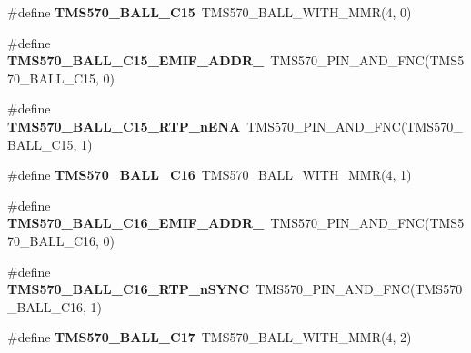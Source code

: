 \begin{DoxyCompactItemize}
\mbox{\label{tms570lc4357-pins_8h_a3f1a39d84701cc2e8a44c9b2fc0c33dd}} 
\#define {\bfseries T\+M\+S570\+\_\+\+B\+A\+L\+L\+\_\+\+C15}~T\+M\+S570\+\_\+\+B\+A\+L\+L\+\_\+\+W\+I\+T\+H\+\_\+\+M\+MR(4, 0)
\item 
\mbox{\label{tms570lc4357-pins_8h_a3ce8f2c75b443108578823520bae6f91}} 
\#define {\bfseries T\+M\+S570\+\_\+\+B\+A\+L\+L\+\_\+\+C15\+\_\+\+E\+M\+I\+F\+\_\+\+A\+D\+D\+R\+\_}~T\+M\+S570\+\_\+\+P\+I\+N\+\_\+\+A\+N\+D\+\_\+\+F\+NC(T\+M\+S570\+\_\+\+B\+A\+L\+L\+\_\+\+C15, 0)
\item 
\mbox{\label{tms570lc4357-pins_8h_ac6518af08529ec983251367b8fb5799b}} 
\#define {\bfseries T\+M\+S570\+\_\+\+B\+A\+L\+L\+\_\+\+C15\+\_\+\+R\+T\+P\+\_\+n\+E\+NA}~T\+M\+S570\+\_\+\+P\+I\+N\+\_\+\+A\+N\+D\+\_\+\+F\+NC(T\+M\+S570\+\_\+\+B\+A\+L\+L\+\_\+\+C15, 1)
\item 
\mbox{\label{tms570lc4357-pins_8h_ac5b737fd92ff1bb7dd30a62441b8b2c8}} 
\#define {\bfseries T\+M\+S570\+\_\+\+B\+A\+L\+L\+\_\+\+C16}~T\+M\+S570\+\_\+\+B\+A\+L\+L\+\_\+\+W\+I\+T\+H\+\_\+\+M\+MR(4, 1)
\item 
\mbox{\label{tms570lc4357-pins_8h_a2e968cb046ddf8fa6fc833d1b1882bf5}} 
\#define {\bfseries T\+M\+S570\+\_\+\+B\+A\+L\+L\+\_\+\+C16\+\_\+\+E\+M\+I\+F\+\_\+\+A\+D\+D\+R\+\_}~T\+M\+S570\+\_\+\+P\+I\+N\+\_\+\+A\+N\+D\+\_\+\+F\+NC(T\+M\+S570\+\_\+\+B\+A\+L\+L\+\_\+\+C16, 0)
\item 
\mbox{\label{tms570lc4357-pins_8h_aebc369283ea73c425eb005f09729db75}} 
\#define {\bfseries T\+M\+S570\+\_\+\+B\+A\+L\+L\+\_\+\+C16\+\_\+\+R\+T\+P\+\_\+n\+S\+Y\+NC}~T\+M\+S570\+\_\+\+P\+I\+N\+\_\+\+A\+N\+D\+\_\+\+F\+NC(T\+M\+S570\+\_\+\+B\+A\+L\+L\+\_\+\+C16, 1)
\item 
\mbox{\label{tms570lc4357-pins_8h_aabfead7e57368d80c87606b0125733f3}} 
\#define {\bfseries T\+M\+S570\+\_\+\+B\+A\+L\+L\+\_\+\+C17}~T\+M\+S570\+\_\+\+B\+A\+L\+L\+\_\+\+W\+I\+T\+H\+\_\+\+M\+MR(4, 2)
\item 
\mbox{\label{tms570lc4357-pins_8h_a05c4cd325eded595ce31f3a138ee33ba}} 

\end{DoxyCompactItemize}
